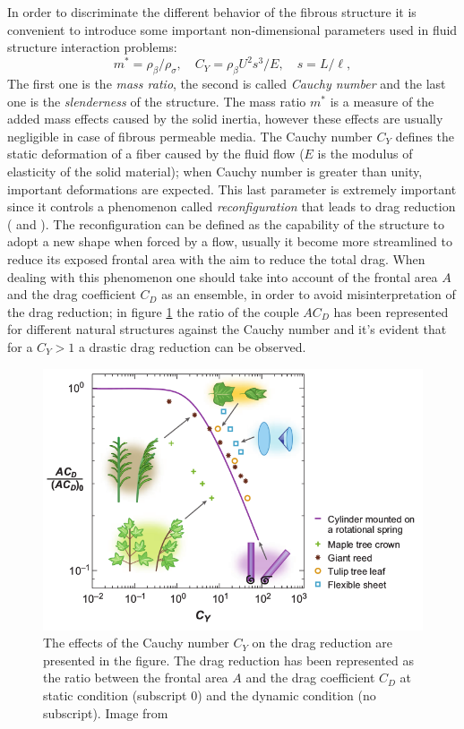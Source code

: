 In order to discriminate the different behavior of the fibrous structure it is convenient to introduce some important non-dimensional parameters used in fluid structure interaction problems:
$$ m^* = \rho_{\beta} / \rho_{\sigma}, \quad C_Y= \rho_{\beta} U^2 s^3 / E, \quad s = L/\ell, $$
The first one is the \textit{mass ratio}, the second is called \textit{Cauchy number} and the last one is the \textit{slenderness} of the structure.
The mass ratio $m^*$ is a measure of the added mass effects caused by the solid inertia, however these effects are usually negligible in case of fibrous permeable media.
The Cauchy number $C_Y$ defines the static deformation of a fiber caused by the fluid flow ($E$ is the modulus of elasticity of the solid material); when Cauchy number is greater than unity, important deformations are expected.
This last parameter is extremely important since it controls a phenomenon called \textit{reconfiguration} that leads to drag reduction (\citet{gosselin2011drag} and \citet{alvarado2017nature}).
The reconfiguration can be defined as the capability of the structure to adopt a new shape when forced by a flow, usually it become more streamlined to reduce its exposed frontal area with the aim to reduce the total drag.
When dealing with this phenomenon one should take into account of the frontal area $A$ and the drag coefficient $C_D$ as an ensemble, in order to avoid misinterpretation of the drag reduction; in figure \ref{fig:cycd} the ratio of the couple $AC_D$ has been represented for different natural structures against the Cauchy number and it's evident that for a $C_Y>1$ a drastic drag reduction can be observed.

\begin{figure}[h]
	\centering
	\includegraphics[width=0.7\linewidth]{chapter_1/cy_cd}
	\caption{The effects of the Cauchy number $C_Y$ on the drag reduction are presented in the figure. The drag reduction has been represented as the ratio between the frontal area $A$ and the drag coefficient $C_D$ at static condition (subscript $0$) and the dynamic condition (no subscript). Image from \citet{de2008effects}}
	\label{fig:cycd}
\end{figure}

